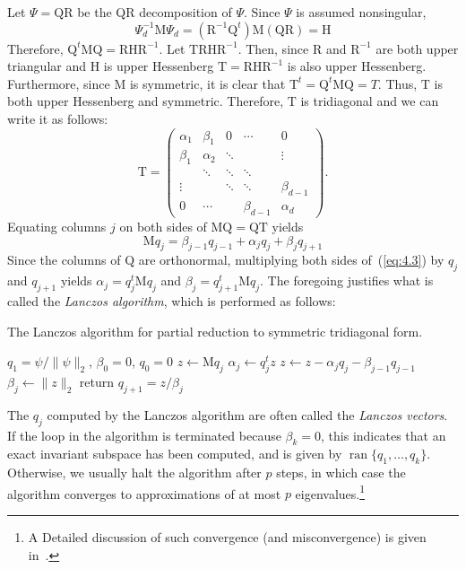 \documentclass[12pt,letterpaper]{report}
\theoremstyle{plain}
\theoremstyle{definition}
\theoremstyle{remark}
\numberwithin{theorem}{chapter}
\numberwithin{claim}{chapter}
\numberwithin{equation}{chapter}
\numberwithin{conjecture}{chapter}
\newcommand\M{\ensuremath{\mathrm{M}}}
\renewcommand\H{\ensuremath{\mathrm{H}}}
\newcommand\T{\ensuremath{\mathrm{T}}}
\newcommand\Q{\ensuremath{\mathrm{Q}}}
\newcommand\mR{\ensuremath{\mathrm{R}}}
\newcommand\ran{\ensuremath{\operatorname{ran}}}
\newcommand\<{\ensuremath{\langle}}
\renewcommand\>{\ensuremath{\rangle}}
\begin{document}
Let $\Psi = \Q\mR$ be the QR decomposition of $\Psi$. Since $\Psi$ is assumed nonsingular,
\[
\Psi_d^{-1}\M \Psi_d = (\mR^{-1}\Q^t)\M(\Q\mR) = \H
\]
Therefore, $\Q^t\M\Q = \mR\H\mR^{-1}$.  Let $\T \mR\H\mR^{-1}$.  Then, since $\mR$
and $\mR^{-1}$ are both upper triangular and $\H$ is upper Hessenberg $\T = \mR\H\mR^{-1}$ is also upper
Hessenberg. Furthermore, since $\M$ is symmetric, it is clear that 
$\T^t =\Q^t\M\Q = T$. Thus, $\T$ is both upper Hessenberg and symmetric. Therefore,
$\T$ is tridiagonal and we can write it as follows:
\begin{equation}
  \label{eq:4.2}
\T = 
\begin{pmatrix}
\alpha_1 & \beta_1 &      0 & \cdots & 0 \\
\beta_1  & \alpha_2 & \ddots &        & \vdots\\
         & \ddots & \ddots & \ddots   &\\
\vdots   &       &  \ddots & \ddots & \beta_{d-1}\\
0  &   \cdots    &   & \beta_{d-1} &\alpha_d
\end{pmatrix}.
\end{equation}
%
%
%
%
Equating columns $j$ on both sides of $\M\Q = \Q\T$ yields
\begin{equation}
\label{eq:4.3}
\M q_j = \beta_{j-1}q_{j-1}+\alpha_j q_j + \beta_j q_{j+1}
\end{equation}
Since the columns of $\Q$ are orthonormal, multiplying both sides 
of~(\ref{eq:4.3})
by $q_j$ and $q_{j+1}$ yields
$\alpha_j = q_j^t \M q_j$ and $\beta_j = q_{j+1}^t \M q_j$.
The foregoing justifies what is called the \emph{Lanczos algorithm}, which is performed as follows:
         \begin{algorithm}
           \caption{The Lanczos algorithm for partial reduction to symmetric
             tridiagonal form.}
           \begin{algorithmic}
             \STATE $q_1 = \psi/\|\psi\|_2$, $\beta_0 = 0$, $q_0= 0$
             \STATE $z \leftarrow \M q_j$
             \STATE $\alpha_j \leftarrow q_j^tz$
             \STATE $z \leftarrow z - \alpha_j q_j - \beta_{j-1} q_{j-1}$
             \STATE $\beta_j \leftarrow \|z\|_2$
             \STATE return
             \ENDIF
             \STATE $q_{j+1} = z/\beta_j$
             \ENDFOR
           \end{algorithmic}
         \end{algorithm}
The $q_j$ computed by the Lanczos algorithm are often called the \emph{Lanczos vectors}. If the
loop in the algorithm is terminated because $\beta_{k}= 0$, this indicates that
an exact invariant subspace has been computed, and is given by 
$\ran\{q_1, \dots, q_k\}$. Otherwise, we usually halt the algorithm after 
$p$ steps, in which case the algorithm converges to approximations of at most
  $p$ eigenvalues.\footnote{A Detailed discussion of such convergence (and
    misconvergence) is given in~\cite{Demmel:1997}.}
\end{document}

